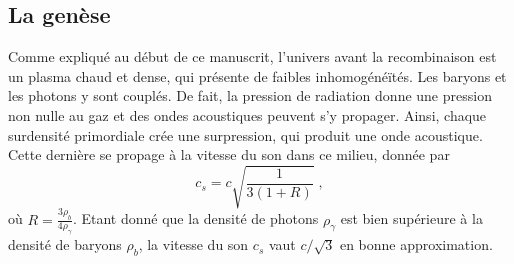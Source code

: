 \subsection{La genèse}
Comme expliqué au début de ce manuscrit, l'univers avant la recombinaison est un plasma chaud et dense, qui présente de faibles inhomogénéïtés.
Les baryons et les photons y sont couplés. De fait, la pression de radiation donne une pression non nulle au gaz et des ondes acoustiques peuvent s'y propager. Ainsi, chaque surdensité primordiale crée une surpression, qui produit une onde acoustique. Cette dernière se propage à la vitesse du son dans ce milieu, donnée par
\begin{equation}
  \label{eq:sound_speed}
  c_{s} = c \sqrt{\frac{1}{3(1 + R)}} \; ,
\end{equation}
où $R = \frac{3\rho_b}{4\rho_{\gamma}}$. Etant donné que la densité de photons $\rho_{\gamma}$ est bien supérieure à la densité de baryons $\rho_{b}$, la vitesse du son $c_s$ vaut $c/\sqrt{3}$ en bonne approximation.
